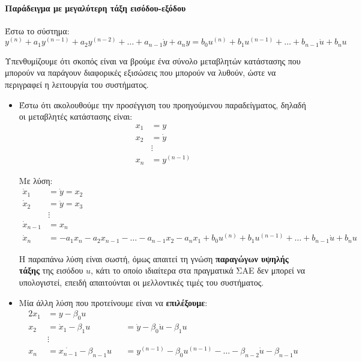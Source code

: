 \documentclass[11pt,a4paper,notitlepage,fleqn]{article}
\begin{document}
\paragraph{Παράδειγμα με μεγαλύτερη τάξη εισόδου-εξόδου}
\label{sec:nontd_highorder_system}
Έστω το σύστημα:
\[
y^{(n)} + a_1y^{(n-1)} + a_2y^{(n-2)} + \dots + a_{n-1}\dot y + a_n y =
b_0 u^{(n)} + b_1u^{(n-1)} + \dots + b_{n-1}\dot u + b_n u
\label{eq:nontd_highorder_system}
\]

Υπενθυμίζουμε ότι σκοπός είναι να βρούμε ένα σύνολο μεταβλητών κατάστασης που μπορούν
να παράγουν διαφορικές εξισώσεις που μπορούν να λυθούν, ώστε να περιγραφεί η λειτουργία του
συστήματος.

\begin{itemize}
	\item Έστω ότι ακολουθούμε την προσέγγιση του προηγούμενου παραδείγματος, δηλαδή οι
	μεταβλητές κατάστασης είναι:
	\begin{align*}
	x_1 &= y \\
	x_2 &= \dot y \\
	&\vdots \\
	x_n &= y^{(n-1)}
	\end{align*}
	
	Με λύση:
	\begin{align*}
	\dot x_1 &= \dot y = x_2\\
	\dot x_2 &= \ddot y = x_3 \\
	&\vdots \\
	\dot x_{n-1} &= x_n\\
	\dot x_n &= -a_1x_n -a_2x_{n-1} - \dots - a_{n-1}x_2 -a_nx_1 + b_0 u^{(n)} + b_1u^{(n-1)} + \dots + b_{n-1}\dot u + b_n u
	\end{align*}

     Η παραπάνω λύση είναι σωστή, όμως απαιτεί τη γνώση \textbf{παραγώγων υψηλής τάξης} της
     εισόδου \( u \), κάτι το οποίο ιδιαίτερα στα πραγματικά ΣΑΕ δεν μπορεί να υπολογιστεί,
     επειδή απαιτούνται οι μελλοντικές τιμές του συστήματος.
     \item Μία άλλη λύση που προτείνουμε είναι να \textbf{επιλέξουμε}:
     \begin{alignat*}{2}
     	x_1 &= y - \beta_0 u && \\
     	x_2 &= \dot x_1 - \beta_1 u &&= \dot y - \beta_0\dot u - \beta_1u \\
     	&\vdots && \\
     	x_n &= \dot{x_{n-1}} - \beta_{n-1}u
     	&&= y^{(n-1)} - \beta_0u^{(n-1)} - \dots - \beta_{n-2}\dot u - \beta_{n-1}u
     \end{alignat*}
     

\end{itemize}
\end{document}
